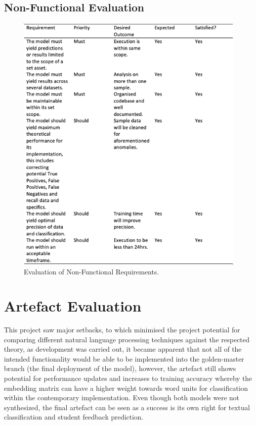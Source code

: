 \subsection{Non-Functional Evaluation}

\begin{figure}[H]
    \centering
    \includegraphics[width=\textwidth]{figures/chapter-7/NonFunctionalEval.png}
    \caption[Evaluation of Non-Functional Requirements]{Evaluation of Non-Functional Requirements.
    \label{fig:NonFunctionalEval}}
\end{figure}

\newpage

\section{Artefact Evaluation}

This project saw major setbacks, to which minimised the project potential for comparing different natural language processing techniques against the respected theory, as development was carried out, it became apparent that not all of the intended functionality would be able to be implemented into the golden-master branch (the final deployment of the model), however, the artefact still shows potential for performance updates and increases to training accuracy whereby the embedding matrix can have a higher weight towards word units for classification within the contemporary implementation. Even though both models were not synthesized, the final artefact can be seen as a success is its own right for textual classification and student feedback prediction.


